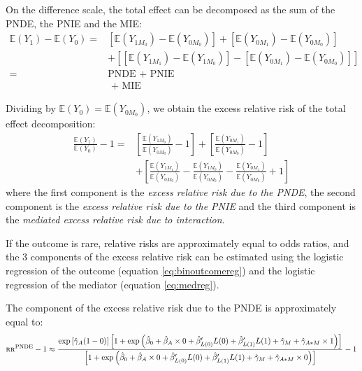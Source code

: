 \documentclass[
]{book}
\begin{document}
On the difference scale, the total effect can be decomposed as the sum of the PNDE, the PNIE and the MIE:
\[\begin{array}{rl}
\mathbb{E}(Y_1) - \mathbb{E}(Y_0) = & \left[ \mathbb{E}\left(Y_{1M_0}\right) - \mathbb{E}\left(Y_{0M_0}\right) \right] + \left[ \mathbb{E}\left(Y_{0M_1}\right) - \mathbb{E}\left(Y_{0M_0}\right) \right] \\ 
                                    & + \left[ \left[ \mathbb{E}\left(Y_{1M_1}\right) - \mathbb{E}\left(Y_{1M_0}\right) \right] - \left[ \mathbb{E}\left(Y_{0M_1}\right) - \mathbb{E}\left(Y_{0M_0}\right) \right] \right] \\
                                  = & \text{PNDE + PNIE} \\
                                    & \text{ + MIE}
\end{array}\]

Dividing by \(\mathbb{E}(Y_0) = \mathbb{E}\left(Y_{0M_0}\right)\), we obtain the excess relative risk of the total effect decomposition:
\[\begin{array}{rl}
 \frac{\mathbb{E}(Y_1)}{\mathbb{E}(Y_0)}-1 = & \left[ \frac{\mathbb{E}\left( Y_{1M_0}\right)}{\mathbb{E}\left( Y_{0M_0}\right)} - 1 \right]  + \left[ \frac{\mathbb{E}\left( Y_{0M_1}\right)}{\mathbb{E}\left( Y_{0M_0}\right)} - 1 \right] \\
                                            & + \left[ \frac{\mathbb{E}\left( Y_{1M_1}\right)}{\mathbb{E}\left( Y_{0M_0}\right)} - \frac{\mathbb{E}\left( Y_{1M_0}\right)}{\mathbb{E}\left( Y_{0M_0}\right)} - \frac{\mathbb{E}\left( Y_{0M_1}\right)}{\mathbb{E}\left( Y_{0M_0}\right)} + 1 \right]
\end{array}\]
where the first component is the \emph{excess relative risk due to the PNDE}, the second component is the \emph{excess relative risk due to the PNIE} and the third component is the \emph{mediated excess relative risk due to interaction}.

If the outcome is rare, relative risks are approximately equal to odds ratios, and the 3 components of the excess relative risk can be estimated using the logistic regression of the outcome (equation \eqref{eq:binoutcomereg}) and the logistic regression of the mediator (equation \eqref{eq:medreg}).

The component of the excess relative risk due to the PNDE is approximately equal to:
\[\scriptsize
\text{RR}^\text{PNDE} - 1 \approx \frac{ \exp \left[ \hat{\gamma}_A (1 - 0) \right] \left[ 1 + \exp \left( \hat{\beta}_0 + \hat{\beta}_A \times 0 + \hat{\beta}_{L(0)}^\prime L(0) + \hat{\beta}_{L(1)}^\prime L(1) + \hat{\gamma}_M + \hat{\gamma}_{A \ast M} \times 1 \right) \right]}{ \left[ 1 + \exp \left( \hat{\beta}_0 + \hat{\beta}_A \times 0 + \hat{\beta}_{L(0)}^\prime L(0) + \hat{\beta}_{L(1)}^\prime L(1) + \hat{\gamma}_M + \hat{\gamma}_{A \ast M} \times 0 \right) \right] } - 1 \]
\end{document}
